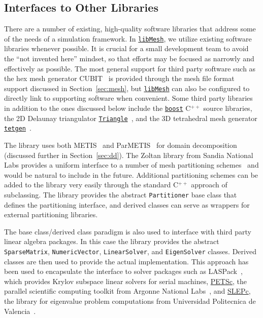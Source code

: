 \documentclass[global,twocolumn,final]{svjour}
\newcommand{\libMesh}{\href{http://libmesh.sourceforge.net}{\texttt{lib\-Mesh}}}
\newcommand{\PETSc}{\href{http://www-unix.mcs.anl.gov/petsc/petsc-2}{PETSc}}
\newcommand{\SLEPc}{\href{http://www.grycap.upv.es/slepc/}{SLEPc}}
\newcommand{\boost}{\href{http://www.boost.org}{\texttt{boost}}}
\newcommand{\Triangle}{\href{http://www.cs.cmu.edu/~quake/triangle.html}{\texttt{Triangle}}}
\newcommand{\tetgen}{\href{http://tetgen.berlios.de}{\texttt{tetgen}}}
\newcommand{\cpp}{C{\tiny$^{++}$}}
\begin{document}
\subsection{Interfaces to Other Libraries\label{sec:libraries}}
There are a number of existing, high-quality software libraries that
address some of the needs of a simulation framework.  In \libMesh, we
utilize existing software libraries whenever possible. It is
crucial for a small development team to avoid the ``not
invented here'' mindset, so that efforts may be focused as narrowly
and effectively as possible.  The most general support for third party
software such as the hex mesh generator CUBIT~\cite{CUBIT} is provided
through the mesh file format support discussed in
Section~\ref{sec:mesh}, but \libMesh{} can also be configured to
directly link to supporting software when convenient.  Some third
party libraries in addition to the ones discussed below include the
\boost{} \cpp{} source libraries, the 2D
Delaunay triangulator \Triangle{}~\cite{shewchuk96b}, and the 3D
tetrahedral mesh generator \tetgen~\cite{tetgen_manual}.

The library uses both METIS~\cite{karypis:metis} and
ParMETIS~\cite{karypis:parmetis} for domain decomposition (discussed
further in Section~\ref{sec:dd}).  The Zoltan library from Sandia
National Labs provides a uniform interface to a number of mesh
partitioning schemes~\cite{ZoltanOverviewArticle} and would be natural
to include in the future.  Additional partitioning schemes can be
added to the library very easily through the standard \cpp{} approach
of subclassing.  The library provides the abstract \texttt{Partitioner}
base class that defines the partitioning interface, and derived classes
can serve as wrappers for external partitioning libraries.

The base class/derived class paradigm is also used to interface with
third party linear algebra packages.  In this case the library provides
the abstract \texttt{Sparse\-Matrix}, \texttt{Numer\-ic\-Vector}, 
\texttt{Linear\-Solver}, and \texttt{Eigen\-Solver} classes.  Derived
classes are then used
to provide the actual implementation.  This approach has been used to
encapsulate the interface to solver packages such as
LASPack~\cite{laspack_manual}, which provides Krylov subspace linear
solvers for serial machines, \PETSc{}, the parallel
scientific computing toolkit from Argonne National
Labs~\cite{petsc-efficient}, and \SLEPc{}, the library for
eigenvalue problem computations from Universidad Politecnica de
Valencia~\cite{slepc_acm}.
\end{document}
